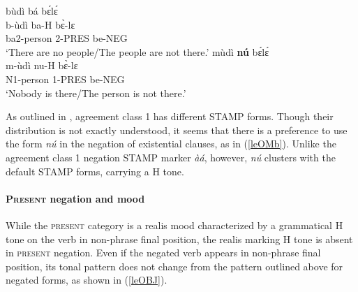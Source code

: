 \begin{exe} 
\ex\label{leOM}
\begin{xlist}
\ex\label{leOMa}
  \glll  bùdì bá bɛ́lɛ́   \\
        b-ùdì ba-H bɛ̀-lɛ \\
         ba2-person 2-PRES be-NEG        \\
    \trans `There are no people/The people are not there.'
\ex\label{leOMb}
  \glll  mùdì {\bfseries nú} bɛ́lɛ́  \\
        m-ùdì nu-H bɛ̀-lɛ \\
         N1-person 1-PRES be-NEG        \\
    \trans `Nobody is there/The person is not there.'
\end{xlist}
\end{exe}

\noindent As outlined in , agreement class 1 has different STAMP forms. Though their distribution is not exactly understood, it seems that there is a preference to use the form {\itshape nú} in the negation of existential clauses, as in (\ref{leOMb}). Unlike the agreement class 1 negation STAMP marker {\itshape àá}, however, {\itshape nú} clusters with the default STAMP forms, carrying a H tone.




\paragraph{\textsc{Present} negation and mood} 

While the \textsc{present} category is a realis mood characterized by a grammatical H tone on the verb in non-phrase final position, the realis marking H tone is absent in \textsc{present} negation. Even if the negated verb appears in non-phrase final position, its tonal pattern does not change from the pattern outlined above for negated forms, as shown in (\ref{leOBJ}).

